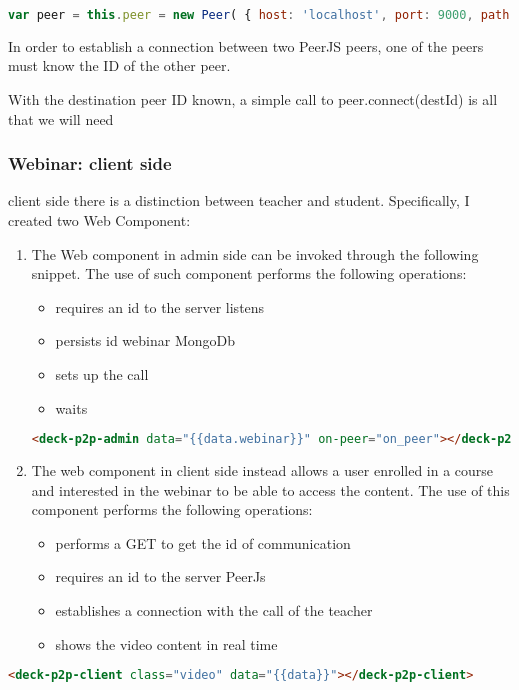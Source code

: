 \begin{lstlisting}[language=javascript]
var peer = this.peer = new Peer( { host: 'localhost', port: 9000, path: '/peerjs'});
\end{lstlisting}

In order to establish a connection between two PeerJS peers, one of the peers must know the ID of the other peer.

With the destination peer ID known, a simple call to peer.connect(destId) is all that we will need

\subsubsection{Webinar: client side}

client side there is a distinction between teacher and student. Specifically, I created two Web Component:
\begin{enumerate}

\item The Web component in admin side can be invoked through the following snippet.
The use of such component performs the following operations:
\begin{itemize}
\item requires an id to the server listens
\item persists id webinar MongoDb
\item sets up the call
\item waits
\end{itemize}

\begin{lstlisting}[language=html]
 <deck-p2p-admin data="{{data.webinar}}" on-peer="on_peer"></deck-p2p-admin>
\end{lstlisting}

\item The web component in client side instead allows a user enrolled in a course and interested in the webinar to be able to access the content.
The use of this component performs the following operations:
\begin{itemize}
\item performs a GET to get the id of communication
\item requires an id to the server PeerJs
\item establishes a connection with the call of the teacher
\item shows the video content in real time
\end{itemize}

\end{enumerate}
\begin{lstlisting}[language=html]
  <deck-p2p-client class="video" data="{{data}}"></deck-p2p-client>
\end{lstlisting}


